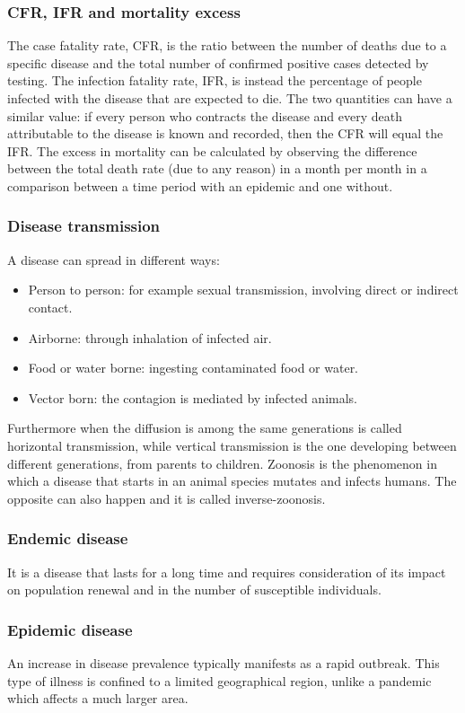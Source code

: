 \subsubsection{CFR, IFR and mortality excess} The case fatality rate, CFR, is the ratio between the number of deaths due to a specific disease and the total number of confirmed positive cases detected by testing. 
The infection fatality rate, IFR, is instead the percentage of people infected with the disease that are expected to die. The two quantities can have a similar value: if every person who contracts the disease and every death attributable to the disease is known and recorded, then the CFR will equal the IFR.
The excess in mortality can be calculated by observing the difference between the total death rate (due to any reason) in a month per month in a comparison between a time period with an epidemic and one without. 


\subsubsection{Disease transmission} A disease can spread in different ways: 
	\begin{itemize}
		\item Person to person: for example sexual transmission, involving direct or indirect contact.
		\item Airborne: through inhalation of infected air.
		\item Food or water borne: ingesting contaminated food or water. 
		\item Vector born: the contagion is mediated by infected animals.
	\end{itemize}
	Furthermore when the diffusion is among the same generations is called horizontal transmission, while vertical transmission is the one developing between different generations, from parents to children. 
	Zoonosis is the phenomenon in which a disease that starts in an animal species mutates and infects humans. The opposite can also happen and it is called inverse-zoonosis. 

\subsubsection{Endemic disease} It is a disease that lasts for a long time and requires consideration of its impact on population renewal and in the number of susceptible individuals.
	
\subsubsection{Epidemic disease} An increase in disease prevalence typically manifests as a rapid outbreak. This type of illness is confined to a limited geographical region, unlike a pandemic which affects a much larger area.

